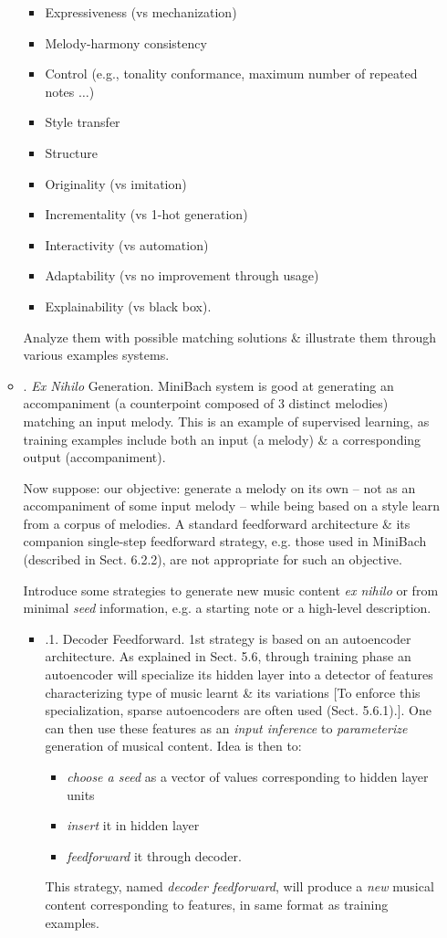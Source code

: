 \documentclass{article}
\begin{document}
\begin{itemize}
\begin{itemize}
\begin{itemize}
			\item Expressiveness (vs mechanization)
			\item Melody-harmony consistency
			\item Control (e.g., tonality conformance, maximum number of repeated notes $\ldots$)
			\item Style transfer
			\item Structure
			\item Originality (vs imitation)
			\item Incrementality (vs 1-hot generation)
			\item Interactivity (vs automation)
			\item Adaptability (vs no improvement through usage)
			\item Explainability (vs black box).
		\end{itemize}
		Analyze them with possible matching solutions \& illustrate them through various examples systems.
		\item {. {\it Ex Nihilo} Generation.} MiniBach system is good at generating an accompaniment (a counterpoint composed of 3 distinct melodies) matching an input melody. This is an example of supervised learning, as training examples include both an input (a melody) \& a corresponding output (accompaniment).
		
		Now suppose: our objective: generate a melody on its own -- not as an accompaniment of some input melody -- while being based on a style learn from a corpus of melodies. A standard feedforward architecture \& its companion single-step feedforward strategy, e.g. those used in MiniBach (described in Sect. 6.2.2), are not appropriate for such an objective.
		
		Introduce some strategies to generate new music content {\it ex nihilo} or from minimal {\it seed} information, e.g. a starting note or a high-level description.
		\begin{itemize}
			\item {.1. Decoder Feedforward.} 1st strategy is based on an autoencoder architecture. As explained in Sect. 5.6, through training phase an autoencoder will specialize its hidden layer into a detector of features characterizing type of music learnt \& its variations [To enforce this specialization, sparse autoencoders are often used (Sect. 5.6.1).]. One can then use these features as an {\it input inference} to {\it parameterize} generation of musical content. Idea is then to:
			\begin{itemize}
				\item {\it choose a seed} as a vector of values corresponding to hidden layer units
				\item {\it insert} it in hidden layer
				\item {\it feedforward} it through decoder.
			\end{itemize}
			This strategy, named {\it decoder feedforward}, will produce a {\it new} musical content corresponding to features, in same format as training examples.
			

\end{itemize}
\end{itemize}
\end{itemize}
\end{document}
